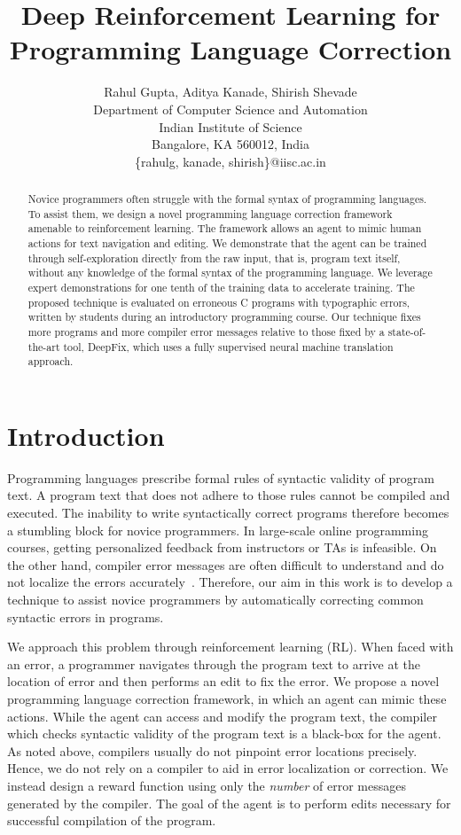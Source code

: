 \documentclass{article}
\title{Deep Reinforcement Learning for Programming Language Correction}
\author{
	Rahul Gupta, 
	Aditya Kanade, 
	Shirish Shevade
	\\ 
	Department of Computer Science and Automation \\
    Indian Institute of Science \\
    Bangalore, KA 560012, India \\
\{rahulg,
	kanade,
	shirish\}@iisc.ac.in
}
\begin{document}
\maketitle

\begin{abstract}
Novice programmers often struggle with the formal syntax of
programming languages.
To assist them, we design a novel programming language correction
framework amenable to reinforcement learning.
The framework allows an agent to mimic human actions for text
navigation and editing.
We demonstrate that the agent can be trained through self-exploration directly from the raw input,
that is, program text itself, without any knowledge of the formal
syntax of the programming language.
We leverage expert demonstrations for one tenth of the training data to accelerate training.
The proposed technique is evaluated on  erroneous C programs with
typographic errors, written by students during an introductory programming
course.
Our technique fixes  more programs and  more compiler error
messages relative to those fixed by a state-of-the-art tool, DeepFix,
which uses a fully supervised neural machine translation approach.
\end{abstract}

 \section{Introduction}
Programming languages prescribe formal rules of syntactic
validity of program text. A program text that does not adhere
to those rules cannot be compiled and executed. The inability
to write syntactically correct programs therefore becomes
a stumbling block for novice programmers. In large-scale online
programming courses, getting personalized feedback from instructors
or TAs is infeasible. On the other hand, compiler error
messages are often difficult to understand and do not localize
the errors accurately~\cite{Traver:2010:CEM:1863617.1945532}.
Therefore, our aim in this work is
to develop a technique to assist novice programmers by
automatically correcting common syntactic errors in programs.

We approach this problem through reinforcement learning (RL).
When faced with an error, a programmer navigates through
the program text to arrive at the location of error and then performs an edit 
to fix the error. We propose a novel {programming language correction} framework, in 
which an agent can mimic these actions. While the agent can access and modify the
program text, the compiler which checks syntactic validity of
the program text is a black-box for the agent. As noted above, compilers
usually do not pinpoint error locations precisely. Hence, we
do not rely on a compiler to aid in error localization or correction.
We instead design a reward function using only the \emph{number} of
error messages generated by the compiler. The goal of the agent 
is to perform edits necessary for successful compilation of the program.
\end{document}
